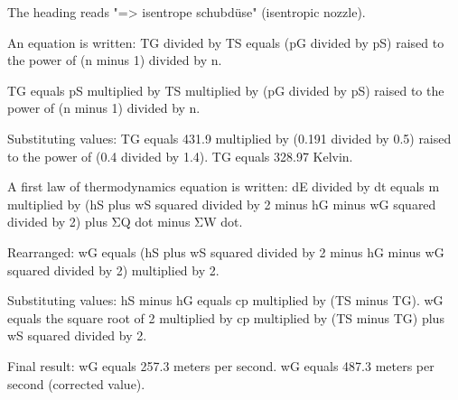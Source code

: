 The heading reads "=> isentrope schubdüse" (isentropic nozzle).  

An equation is written:  
TG divided by TS equals (pG divided by pS) raised to the power of (n minus 1) divided by n.  

TG equals pS multiplied by TS multiplied by (pG divided by pS) raised to the power of (n minus 1) divided by n.  

Substituting values:  
TG equals 431.9 multiplied by (0.191 divided by 0.5) raised to the power of (0.4 divided by 1.4).  
TG equals 328.97 Kelvin.  

A first law of thermodynamics equation is written:  
dE divided by dt equals m multiplied by (hS plus wS squared divided by 2 minus hG minus wG squared divided by 2) plus ΣQ dot minus ΣW dot.  

Rearranged:  
wG equals (hS plus wS squared divided by 2 minus hG minus wG squared divided by 2) multiplied by 2.  

Substituting values:  
hS minus hG equals cp multiplied by (TS minus TG).  
wG equals the square root of 2 multiplied by cp multiplied by (TS minus TG) plus wS squared divided by 2.  

Final result:  
wG equals 257.3 meters per second.  
wG equals 487.3 meters per second (corrected value).